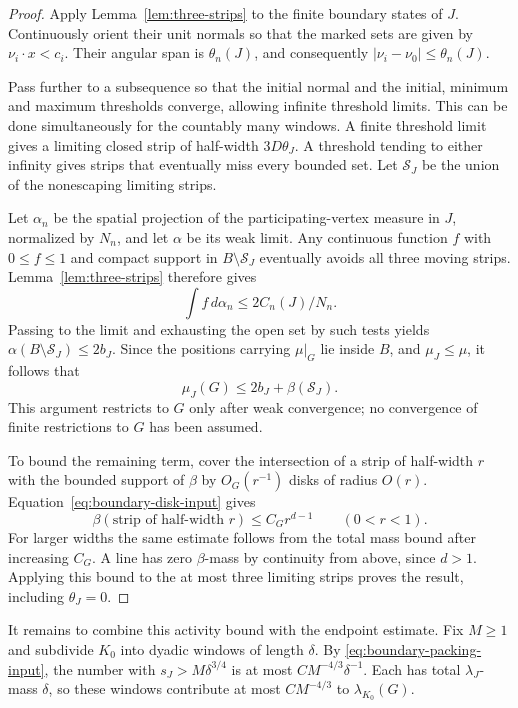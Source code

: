 \begin{proof}
Apply Lemma~\ref{lem:three-strips} to the finite boundary states of
$J$. Continuously orient their unit normals so that the marked sets
are given by $\nu_i\cdot x<c_i$. Their angular span is
$\theta_n(J)$, and consequently $|\nu_i-\nu_0|\leq\theta_n(J)$.

Pass further to a subsequence so that the initial normal and the
initial, minimum and maximum thresholds converge, allowing infinite
threshold limits. This can be done simultaneously for the countably
many windows. A finite threshold limit gives a limiting closed strip
of half-width $3D\theta_J$. A threshold tending to either infinity
gives strips that eventually miss every bounded set. Let $\mathcal S_J$ be
the union of the nonescaping limiting strips.

Let $\alpha_n$ be the spatial projection of the participating-vertex
measure in $J$, normalized by $N_n$, and let $\alpha$ be its weak
limit. Any continuous function $f$ with $0\leq f\leq1$ and compact
support in $B\setminus\mathcal S_J$ eventually avoids all three moving strips.
Lemma~\ref{lem:three-strips} therefore gives
\[
 \int f\,d\alpha_n\leq 2C_n(J)/N_n.
\]
Passing to the limit and exhausting the open set by such tests yields
$\alpha(B\setminus\mathcal S_J)\leq2b_J$. Since the positions carrying
$\mu|_G$ lie inside $B$, and $\mu_J\leq\mu$, it follows that
\[
 \mu_J(G)\leq2b_J+\beta(\mathcal S_J).
\]
This argument restricts to $G$ only after weak convergence; no
convergence of finite restrictions to $G$ has been assumed.

To bound the remaining term, cover the intersection of a strip of
half-width $r$ with the bounded support of $\beta$ by $O_G(r^{-1})$
disks of radius $O(r)$. Equation~\eqref{eq:boundary-disk-input} gives
\[
 \beta(\text{strip of half-width }r)\leq C_G r^{d-1}
 \qquad(0<r<1).
\]
For larger widths the same estimate follows from the total mass bound
after increasing $C_G$. A line has zero $\beta$-mass by continuity
from above, since $d>1$. Applying this bound to the at most three
limiting strips proves the result, including $\theta_J=0$.
\end{proof}

It remains to combine this activity bound with the endpoint estimate.
Fix $M\geq1$ and subdivide $K_0$ into dyadic windows of length
$\delta$. By \eqref{eq:boundary-packing-input}, the number with
$s_J>M\delta^{3/4}$ is at most
$C M^{-4/3}\delta^{-1}$. Each has total $\lambda_J$-mass $\delta$,
so these windows contribute at most $C M^{-4/3}$ to
$\lambda_{K_0}(G)$.

